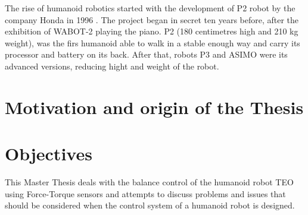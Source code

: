 The rise of humanoid robotics started with the development of P2 robot by the company Honda in 1996 \cite{Kaj2005}. The project began in secret ten years before, after the exhibition of WABOT-2 playing the piano. P2 (180 centimetres high and 210 kg weight), was the firs humanoid able to walk in a stable enough way and carry its processor and battery on its back. After that, robots P3 and ASIMO were its advanced versions, reducing hight and weight of the robot.


\section{Motivation and origin of the Thesis}

\section{Objectives}
This Master Thesis deals with the balance control of the humanoid robot TEO using Force-Torque sensors and attempts to discuss problems and issues that should be considered when the control system of a humanoid robot is designed. 

